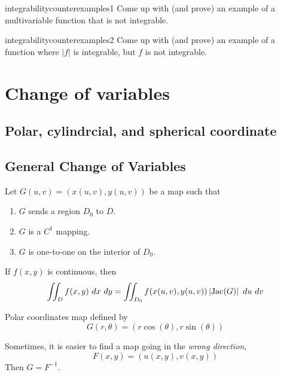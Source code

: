 \begin{problem}{integrabilitycounterexamples1}
Come up with (and prove) an example of a multivariable function that is not integrable.
\end{problem}

\begin{problem}{integrabilitycounterexamples2}
Come up with (and prove) an example of a function where $|f|$ is integrable, but $f$ is not integrable.
\end{problem}

\section{Change of variables}

\subsection{Polar, cylindrcial, and spherical coordinate}

\subsection{General Change of Variables}





\begin{theorem}
    Let  $G(u,v) = \left(x(u,v), y(u,v)\right)$ be a map such that
    
    \begin{enumerate}
        \item $G$ sends a region $D_0$ to $D$.  
        \item $G$ is a $C^1$ mapping.
        \item $G$ is one-to-one on the interior of $D_0$.  
    \end{enumerate}

    
    If $f(x,y)$ is continuous, then
    $$\iint_D f(x,y) \ dx \ dy = \iint_{D_0} f(x(u,v), y(u,v)) \left|\textnormal{Jac}(G)\right| \ du \ dv$$
    
\end{theorem}

\begin{example}
    Polar coordinates map defined by $$G(r,\theta) = (r\cos(\theta), r\sin(\theta))$$
\end{example}

\begin{remark}
    Sometimes, it is easier to find a map going in the \textit{wrong direction}, $$F(x,y) = (u(x,y),v(x,y))$$
    Then $G = F^{-1}$.
    \end{remark}
    
